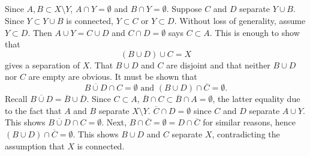 \documentclass[12pt]{article}
\begin{document}
\subsection{} 
Since $A, B \subset X \setminus Y$, $A \cap Y = \emptyset$ and $B \cap Y = \emptyset$. 
Suppose $C$ and $D$ separate $Y \cup B$. 
Since $Y \subset Y \cup B$ is connected, $Y \subset C$ or $Y \subset D$. 
Without loss of generality, assume $Y \subset D$.
Then $A \cup Y = C \cup D$ and $C \cap D = \emptyset$ says $C \subset A$. 
This is enough to show that 
$$(B \cup D) \cup C = X$$
gives a separation of $X$. 
That $B \cup D$ and $C$ are disjoint and that neither $B \cup D$ nor $C$ are empty are obvious. 
It must be shown that 
$$\overline{B \cup D} \cap C = \emptyset \text{ and } (B \cup D) \cap \overline{C} = \emptyset.$$
Recall $\overline{B \cup D} = \overline{B} \cup \overline{D}$. 
Since $C \subset A$, $\overline{B} \cap C \subset \overline{B} \cap A = \emptyset$, the latter equality due to the fact that $A$ and $B$ separate $X \setminus Y$. 
$\overline{C} \cap D = \emptyset$ since $C$ and $D$ separate $A \cup Y$. 
This shows $\overline{B \cup D} \cap C = \emptyset$. 
Next, $B \cap \overline{C} = \emptyset = D \cap \overline{C}$ for similar reasons, hence 
$(B \cup D) \cap \overline{C} = \emptyset$. 
This shows $B \cup D$ and $C$ separate $X$, contradicting the assumption that $X$ is connected. 
\end{document}
